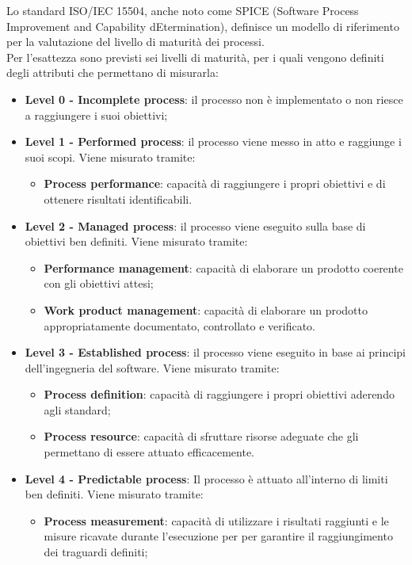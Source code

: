 Lo standard ISO/IEC 15504, anche noto come SPICE (Software Process Improvement and Capability dEtermination), definisce un modello di riferimento per la valutazione del livello di maturità dei processi. \\ Per l'esattezza sono previsti sei livelli di maturità, per i quali vengono definiti degli attributi che permettano di misurarla:
\begin{itemize}
\item\textbf{Level 0 - Incomplete process}: il processo non è implementato o non riesce a raggiungere i suoi obiettivi;
\item\textbf{Level 1 - Performed process}: il processo viene messo in atto e raggiunge i suoi scopi. Viene misurato tramite:
\begin{itemize}
\item\textbf{Process performance}: capacità di raggiungere i propri obiettivi e di ottenere risultati identificabili.
\end{itemize}
\item\textbf{Level 2 - Managed process}: il processo viene eseguito sulla base di obiettivi ben definiti. Viene misurato tramite:
\begin{itemize}
\item\textbf{Performance management}: capacità di elaborare un prodotto coerente con gli obiettivi attesi;
\item\textbf{Work product management}: capacità di elaborare un prodotto appropriatamente documentato, controllato e verificato.
\end{itemize}
\item\textbf{Level 3 - Established process}: il processo viene eseguito in base ai principi dell’ingegneria del software. Viene misurato tramite:
\begin{itemize}
\item\textbf{Process definition}: capacità di raggiungere i propri obiettivi aderendo agli standard;
\item\textbf{Process resource}: capacità di sfruttare risorse adeguate che gli permettano di essere attuato efficacemente.
\end{itemize}
\item\textbf{Level 4 - Predictable process}: Il processo è attuato all'interno di limiti ben definiti. Viene misurato tramite:
\begin{itemize}
\item\textbf{Process measurement}: capacità di utilizzare i risultati raggiunti e le misure ricavate durante l'esecuzione per per garantire il raggiungimento dei traguardi definiti;

\end{itemize}
\end{itemize}
